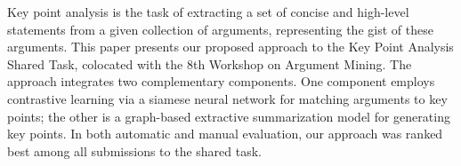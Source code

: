 Key point analysis is the task of extracting a set of concise and high-level statements from a given collection of arguments, representing the gist of these arguments. This paper presents our proposed approach to the Key Point Analysis Shared Task, colocated with the 8th Workshop on Argument Mining. The approach integrates two complementary components. One component employs contrastive learning via a siamese neural network for matching arguments to key points; the other is a graph-based extractive summarization model for generating key points. In both automatic and manual evaluation, our approach was ranked best among all submissions to the shared task.
